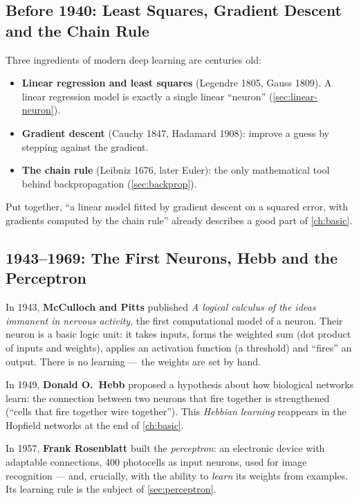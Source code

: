 \documentclass[11pt, oneside]{book}
\let\originalsubsection\subsection
\renewcommand{\subsection}{\Needspace{6\baselineskip}\originalsubsection}
\begin{document}
\subsection{Before 1940: Least Squares, Gradient Descent and the Chain Rule}

Three ingredients of modern deep learning are centuries old:
\begin{itemize}
  \item \textbf{Linear regression and least squares} (Legendre 1805, Gauss
    1809). A linear regression model is exactly a single linear
    ``neuron'' (\cref{sec:linear-neuron}).
  \item \textbf{Gradient descent} (Cauchy 1847, Hadamard 1908): improve a
    guess by stepping against the gradient.
  \item \textbf{The chain rule} (Leibniz 1676, later Euler): the only
    mathematical tool behind backpropagation (\cref{sec:backprop}).
\end{itemize}
Put together, ``a linear model fitted by gradient descent on a squared error,
with gradients computed by the chain rule'' already describes a good part of
\cref{ch:basic}.

\subsection{1943--1969: The First Neurons, Hebb and the Perceptron}

In 1943, \textbf{McCulloch and Pitts} published \emph{A logical calculus of
the ideas immanent in nervous activity}, the first computational model of a
neuron. Their neuron is a basic logic unit: it takes inputs, forms the
weighted sum (dot product of inputs and weights), applies an activation
function (a threshold) and ``fires'' an output. There is no learning --- the
weights are set by hand.

In 1949, \textbf{Donald O.~Hebb} proposed a hypothesis about how biological
networks learn: the connection between two neurons that fire together is
strengthened (``cells that fire together wire together''). This
\emph{Hebbian learning} reappears in the Hopfield networks at the end of
\cref{ch:basic}.

In 1957, \textbf{Frank Rosenblatt} built the \emph{perceptron}: an electronic
device with adaptable connections, 400 photocells as input neurons, used for
image recognition --- and, crucially, with the ability to \emph{learn} its
weights from examples. Its learning rule is the subject of
\cref{sec:perceptron}.
\end{document}
